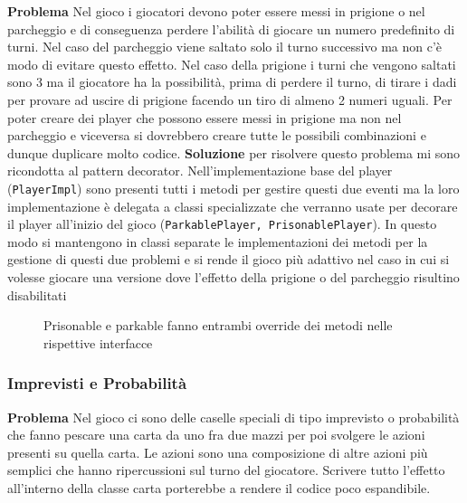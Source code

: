\textbf{Problema}\newline
Nel gioco i giocatori devono poter essere messi in prigione o nel parcheggio e di conseguenza perdere l’abilità di giocare un numero predefinito di turni. 
Nel caso del parcheggio viene saltato solo il turno successivo ma non c’è modo di evitare questo effetto.
Nel caso della prigione i turni che vengono saltati sono 3 ma il giocatore ha la possibilità, prima di perdere il turno, di tirare i dadi per provare ad uscire di prigione facendo un tiro di almeno 2 numeri uguali.
Per poter creare dei player che possono essere messi in prigione ma non nel parcheggio e viceversa si dovrebbero creare tutte le possibili combinazioni e dunque duplicare molto codice.\newline
\textbf{Soluzione}\newline
per risolvere questo problema mi sono ricondotta al pattern decorator. 
Nell'implementazione base del player (\texttt{PlayerImpl}) sono presenti tutti i metodi per gestire questi due eventi ma la loro implementazione è delegata a classi specializzate che verranno usate per decorare il player all’inizio del gioco (\texttt{ParkablePlayer, PrisonablePlayer}). 
In questo modo si mantengono in classi separate le implementazioni dei metodi per la gestione di questi due problemi e si rende il gioco più adattivo nel caso in cui si volesse giocare una versione dove l’effetto della prigione o del parcheggio risultino disabilitati

\begin{figure}[H]
    \centering
    \caption{Prisonable e parkable fanno entrambi override dei metodi nelle rispettive interfacce}
    \label{img:ArchitectureDiagram-Pagina-2}
\end{figure}

\subsubsection{Imprevisti e Probabilità}

\textbf{Problema}\newline
Nel gioco ci sono delle caselle speciali di tipo imprevisto o probabilità che fanno pescare una carta da uno fra due mazzi per poi svolgere le azioni presenti su quella carta.
Le azioni sono una composizione di altre azioni più semplici che hanno ripercussioni sul turno del giocatore.
Scrivere tutto l’effetto all’interno della classe carta porterebbe a rendere il codice poco espandibile.

